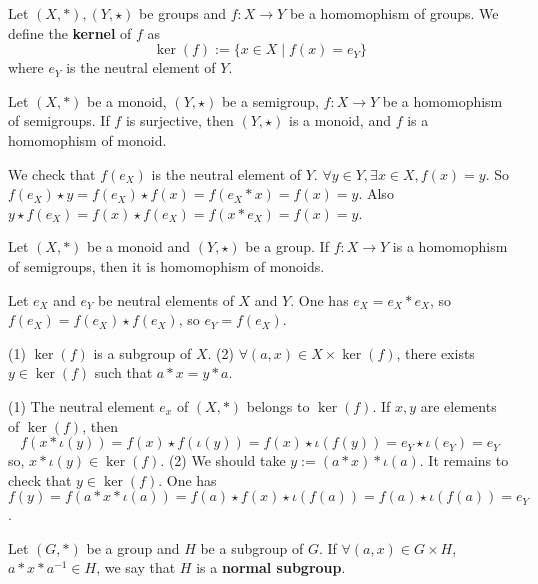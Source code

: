 \documentclass{book}
\numberwithin{equation}{section}
\begin{document}
\begin{definitionenv}
    Let $(X,*),(Y,\star)$ be groups and $f:X\rightarrow Y$ be a homomophism of groups. We define the \textbf{kernel} of $f$ as 
    $$\ker(f):=\{x\in X\mid f(x)=e_Y\}$$
    where $e_Y$ is the neutral element of $Y$.
\end{definitionenv}
\begin{propositionenv}
    Let $(X,*)$ be a monoid, $(Y,\star)$ be a semigroup, $f:X\rightarrow Y$ be a homomophism of semigroups. If $f$ is surjective, then $(Y,\star)$ is a monoid, and $f$ is a homomophism of monoid.
\end{propositionenv}
\begin{proofenv}
    We check that $f(e_X)$ is the neutral element of $Y$. $\forall y\in Y,\exists x\in X,f(x)=y$. So $f(e_X)\star y=f(e_X)\star f(x)=f(e_X*x)=f(x)=y$. Also $y\star f(e_X)=f(x)\star f(e_X)=f(x*e_X)=f(x)=y$.
\end{proofenv}
\begin{propositionenv}
    Let $(X,*)$ be a monoid and $(Y,\star)$ be a group. If $f:X\rightarrow Y$ is a homomophism of semigroups, then it is homomophism of monoids.
\end{propositionenv}
\begin{proofenv}
    Let $e_X$ and $e_Y$ be neutral elements of $X$ and $Y$. One has $e_X=e_X*e_X$, so $f(e_X)=f(e_X)\star f(e_X)$, so $e_Y=f(e_X)$.
\end{proofenv}
\begin{propositionenv}
    \quad
    \newline
    (1) $\ker(f)$ is a subgroup of $X$.
    \newline
    (2) $\forall (a,x)\in X\times \ker(f) $, there exists $y\in \ker(f)$ such that $a*x=y*a$.
\end{propositionenv}
\begin{proofenv}
    \quad
    \newline
    (1) The neutral element $e_x$ of $(X,*)$ belongs to $\ker(f)$. If $x,y$ are elements of $\ker(f)$, then 
    $$f(x*\iota(y))=f(x)\star f(\iota(y))=f(x)\star \iota(f(y))=e_Y\star\iota(e_Y)=e_Y$$
    so, $x*\iota(y)\in \ker(f)$.
    \newline
    (2) We should take $y:=(a*x)*\iota(a)$. It remains to check that $y\in \ker(f)$. One has $f(y)=f(a*x*\iota(a))=f(a)\star f(x)\star \iota(f(a))=f(a)\star \iota(f(a))=e_Y$.
\end{proofenv}
\begin{definitionenv}
    Let $(G,*)$ be a group and $H$ be a subgroup of $G$. If $\forall (a,x)\in G\times H$, $a*x*a^{-1}\in H$, we say that $H$ is a \textbf{normal subgroup}.
\end{definitionenv}
\end{document}
